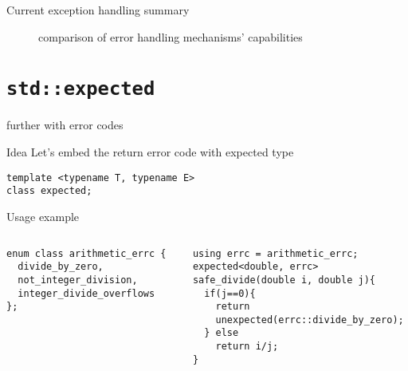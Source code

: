 \documentclass[10pt,a4paper]{beamer}
\begin{document}
\begin{frame}{Current exception handling summary}
	\centering

	\begin{figure}
	
		\caption{comparison of error handling mechanisms' capabilities}	
	\end{figure}
	

\end{frame}

\section{\texttt{std::expected}}
\begin{frame}[fragile]{further with error codes}
\begin{block}{Idea}
	Let's embed the return error code with expected type
\end{block}

\vfill

\begin{verbatim}
template <typename T, typename E>
class expected;
\end{verbatim}
\end{frame}



\begin{frame}[fragile]{Usage example}

\begin{columns}
\begin{column}{0.48\linewidth}
	\begin{verbatim}
enum class arithmetic_errc {
  divide_by_zero,
  not_integer_division,      
  integer_divide_overflows
};
	\end{verbatim}
\end{column}
\pause
\begin{column}{0.48\linewidth}
	\begin{verbatim}
using errc = arithmetic_errc;
expected<double, errc>
safe_divide(double i, double j){
  if(j==0){ 
    return 
    unexpected(errc::divide_by_zero);
  } else 
    return i/j;
}
	\end{verbatim}
\end{column}
\end{columns}
\end{frame}
\end{document}
